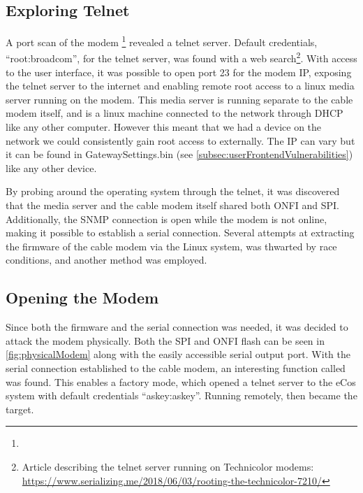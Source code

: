 \subsection{Exploring Telnet}
A port scan of the modem \footnote{} revealed a telnet server.
Default credentials, \enquote{root:broadcom}, for the telnet server, was found with a web search\footnote{Article describing the telnet server running on Technicolor modems: \url{https://www.serializing.me/2018/06/03/rooting-the-technicolor-7210/}}.
With access to the user interface, it was possible to open port 23 for the modem IP, exposing the telnet server to the internet and enabling remote root access to a linux media server running on the modem.
This media server is running separate to the cable modem itself, and is a linux machine connected to the network through DHCP like any other computer. However this meant that we had a device on the network we could consistently gain root access to externally.
The IP can vary but it can be found in GatewaySettings.bin (see \cref{subsec:userFrontendVulnerabilities}) like any other device.

By probing around the operating system through the telnet, it was discovered that the media server and the cable modem itself shared both ONFI and SPI.
Additionally, the SNMP connection is open while the modem is not online, making it possible to establish a serial connection.
Several attempts at extracting the firmware of the cable modem via the Linux system, was thwarted by race conditions, and another method was employed.

\subsection{Opening the Modem}
Since both the firmware and the serial connection was needed, it was decided to attack the modem physically.
Both the SPI and ONFI flash can be seen in \cref{fig:physicalModem} along with the easily accessible serial output port.
With the serial connection established to the cable modem, an interesting function called  was found.
This enables a factory mode, which opened a telnet server to the eCos system with default credentials \enquote{askey:askey}.
Running  remotely, then became the target.

